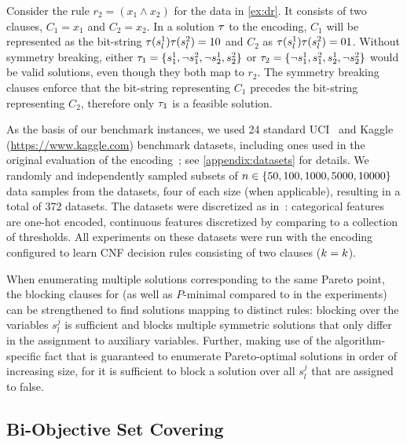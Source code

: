 \begin{example}
  Consider the rule $r_2 = (x_1 \land x_2)$ for the data in \cref{ex:dr}.
  It consists of two clauses, $C_1 = x_1$ and $C_2 = x_2$.
  In a solution $\tau$ to the encoding, $C_1$ will be represented as the bit-string $\tau(s_l^1)\tau(s_l^2)=10$ and $C_2$ as $\tau(s_l^1)\tau(s_l^2)=01$.
  Without symmetry breaking, either $\tau_1 = \{s_1^1, \lnot s_1^2, \lnot s_2^1, s_2^2\}$ or $\tau_2 = \{\lnot s_1^1, s_1^2, s_2^1, \lnot s_2^2\}$ would be valid solutions, even though they both map to $r_2$.
  The symmetry breaking clauses enforce that the bit-string representing $C_1$ precedes the bit-string representing $C_2$, therefore only $\tau_1$ is a feasible solution.
\end{example}

As the basis of our benchmark instances, we used 24 standard UCI~\autocite{UciMlr} and Kaggle ({\small\url{https://www.kaggle.com}}) benchmark datasets, including ones used in the original evaluation of the encoding~\autocite{DBLP:conf/cp/MaliotovM18}; see \cref{appendix:datasets} for details.
We randomly and independently sampled subsets of $n\in\{50,100,1000,5000,10000\}$ data samples from the datasets, four of each size (when applicable), resulting in a total of 372 datasets.
The datasets were discretized as in~\autocite{DBLP:conf/cp/MaliotovM18}:
categorical features are one-hot encoded, continuous features discretized by comparing to a collection of thresholds.
All experiments on these datasets were run with the encoding configured to learn CNF decision rules consisting of two clauses ($k = k$).

When enumerating multiple solutions corresponding to the same Pareto point, the blocking clauses for \algname{} (as well as $P$-minimal compared to in the experiments) can be strengthened to find solutions mapping to distinct rules:
blocking over the variables $s_l^j$ is sufficient and blocks multiple symmetric solutions that only differ in the assignment to auxiliary variables.
Further, making use of the algorithm-specific fact that \algname{} is guaranteed to enumerate Pareto-optimal solutions in order of increasing size, for \algname{} it is sufficient to block a solution over all $s_l^j$ that are assigned to false.

\subsection{Bi-Objective Set Covering}

